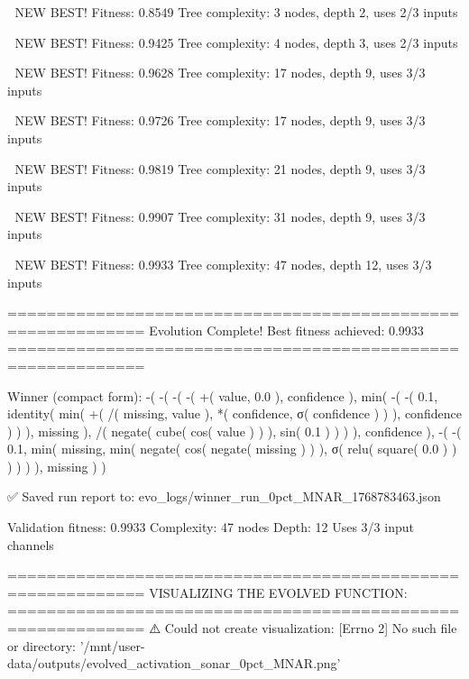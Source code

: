 🎯 NEW BEST! Fitness: 0.8549
Tree complexity: 3 nodes, depth 2, uses 2/3 inputs

🎯 NEW BEST! Fitness: 0.9425
Tree complexity: 4 nodes, depth 3, uses 2/3 inputs

🎯 NEW BEST! Fitness: 0.9628
Tree complexity: 17 nodes, depth 9, uses 3/3 inputs

🎯 NEW BEST! Fitness: 0.9726
Tree complexity: 17 nodes, depth 9, uses 3/3 inputs

🎯 NEW BEST! Fitness: 0.9819
Tree complexity: 21 nodes, depth 9, uses 3/3 inputs

🎯 NEW BEST! Fitness: 0.9907
Tree complexity: 31 nodes, depth 9, uses 3/3 inputs

🎯 NEW BEST! Fitness: 0.9933
Tree complexity: 47 nodes, depth 12, uses 3/3 inputs

============================================================
Evolution Complete!
Best fitness achieved: 0.9933
============================================================

Winner (compact form):
 -(
  -(
    -(
      -(
        +(
          value,
          0.0
        ),
        confidence
      ),
      min(
        -(
          -(
            0.1,
            identity(
              min(
                +(
                  /(
                    missing,
                    value
                  ),
                  *(
                    confidence,
                    σ(
                      confidence
                    )
                  )
                ),
                confidence
              )
            )
          ),
          missing
        ),
        /(
          negate(
            cube(
              cos(
                value
              )
            )
          ),
          sin(
            0.1
          )
        )
      )
    ),
    confidence
  ),
  -(
    -(
      0.1,
      min(
        missing,
        min(
          negate(
            cos(
              negate(
                missing
              )
            )
          ),
          σ(
            relu(
              square(
                0.0
              )
            )
          )
        )
      )
    ),
    missing
  )
)

✅ Saved run report to: evo_logs/winner_run_0pct_MNAR_1768783463.json

Validation fitness: 0.9933
Complexity: 47 nodes
Depth: 12
Uses 3/3 input channels

============================================================
VISUALIZING THE EVOLVED FUNCTION:
============================================================
⚠️ Could not create visualization: [Errno 2] No such file or directory: '/mnt/user-data/outputs/evolved_activation_sonar_0pct_MNAR.png'


